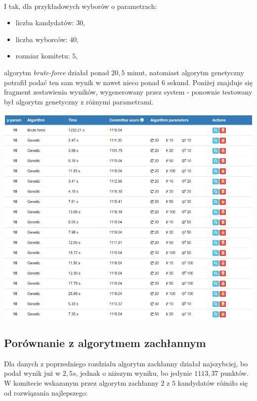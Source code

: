 \documentclass[pdflatex,11pt]{../aghdoc_version2}
\begin{document}
~\\
I tak, dla przykładowych wyborów o parametrach:
\begin{itemize}
\item liczba kandydatów: $30$,
\item liczba wyborców: $40$,
\item rozmiar komitetu: $5$,
\end{itemize}
algorytm \textit{brute-force} działał ponad $20,5$ minut, natomiast algorytm genetyczny potrafił podać ten sam wynik w nawet nieco ponad $6$ sekund. Poniżej znajduje się fragment zestawienia wyników, wygenerowany przez system - ponownie testowany był algorytm genetyczny z różnymi parametrami.

\includegraphics[width=\textwidth]{pics/porownanie-gen-brut.png}


\subsection{Porównanie z algorytmem zachłannym}
Dla danych z poprzedniego rozdziału algorytm zachłanny działał najszybciej, bo podał wynik już w $2,5s$, jednak o niższym wyniku, bo jedynie $1113,37$ punktów. W komitecie wskazanym przez algorytm zachłanny $2$ z $5$ kandydatów różniło się od rozwiązania najlepszego:
\end{document}
